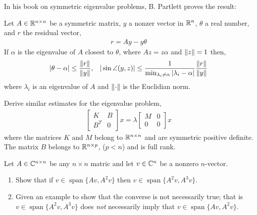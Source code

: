 \documentclass[10pt]{article}
\begin{document}
\begin{problem}
In his book on symmetric eigenvalue problems, B. Partlett proves the
result:

\hrulefill

    Let \( A\in\mathbb{R}^{n\times n} \) be a symmetric matrix, \( y \) a nonzer vector in \( \mathbb{R}^n \), \( \theta \) a real number, and \( r \) the residual vector,
    \begin{align*}
        r = Ay - y\theta
    \end{align*}
    If \( \alpha \) is the eigenvalue of \( A \) closest to \( \theta \), where \( Az = z\alpha \) and \( \left\lVert z\right\rVert=1 \) then,
    \begin{align*}
        |\theta-\alpha| \leq \frac{\left\lVert r\right\rVert}{\left\lVert y\right\rVert}, && |\sin \angle (y,z) |\leq \frac{1}{\min_{\lambda_i\neq \alpha} | \lambda_i-\alpha|} \frac{\left\lVert r\right\rVert}{\left\lVert y\right\rVert}
    \end{align*}
    where \( \lambda_i \) is an eigenvalue of \( A \) and \( \left\lVert\cdot\right\rVert \) is the Euclidian norm.

    \hrulefill
    
    Derive similar estimates for the eigenvalue problem,
    \begin{align*}
        \left[\begin{array}{cc}K & B \\ B^T & 0\end{array}\right] x = \lambda \left[\begin{array}{cc}M & 0 \\ 0 & 0\end{array}\right] x
    \end{align*}
    where the matrices \( K \) and \( M \) belong to \( \mathbb{R}^{n\times n} \) and are symmetric positive definite. The matrix \( B \) belongs to \( \mathbb{R}^{n\times p} \), (\( p<n \)) and is full rank.

\end{problem}

\begin{solution}[Solution]
    
\end{solution}


\begin{problem}
Let \( A\in\mathbb{C}^{n\times n} \) be any \( n\times n \) matric and let \( v\in\mathbb{C}^n \) be a nonzero \( n \)-vector.
\begin{enumerate}[nolistsep,label=(\alph*)]
    \item Show that if \( v\in\operatorname{span}\{Av,A^2v\} \) then \( v\in\operatorname{span}\{A^2v,A^3v\} \).
    \item Given an example to show that the converse is not necessarily true; that is \( v\in \operatorname{span}\{A^2v,A^3v\} \) does \textit{not} necessarily imply that \( v\in\operatorname{span}\{Av,A^2v\} \).
\end{enumerate}
\end{problem}
\end{document}
